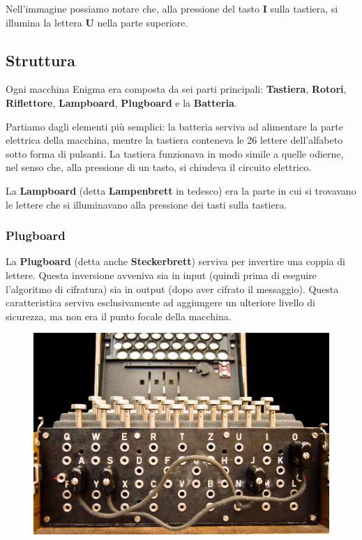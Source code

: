 \documentclass{rapport}
\begin{document}
\vspace{+1.5cm}

Nell'immagine possiamo notare che, alla pressione del tasto \textbf{I} sulla tastiera, si illumina la lettera \textbf{U} nella parte superiore.

\afterpage{\clearpage}



\newpage
\subsection{Struttura}

Ogni macchina Enigma era composta da sei parti principali: \textbf{Tastiera}, \textbf{Rotori}, \textbf{Riflettore}, \textbf{Lampboard}, \textbf{Plugboard} e la \textbf{Batteria}.  

Partiamo dagli elementi più semplici: la batteria serviva ad alimentare la parte elettrica della macchina, mentre la tastiera conteneva le 26 lettere dell'alfabeto sotto forma di pulsanti. La tastiera funzionava in modo simile a quelle odierne, nel senso che, alla pressione di un tasto, si chiudeva il circuito elettrico.  

La \textbf{Lampboard} (detta \textbf{Lampenbrett} in tedesco) era la parte in cui si trovavano le lettere che si illuminavano alla pressione dei tasti sulla tastiera.  

\subsubsection{Plugboard}

La \textbf{Plugboard} (detta anche \textbf{Steckerbrett}) serviva per invertire una coppia di lettere. Questa inversione avveniva sia in input (quindi prima di eseguire l'algoritmo di cifratura) sia in output (dopo aver cifrato il messaggio). Questa caratteristica serviva esclusivamente ad aggiungere un ulteriore livello di sicurezza, ma non era il punto focale della macchina.

\begin{figure}[h]
    \centering
    \includegraphics[width=0.6\linewidth]{logos/2_3cripto.jpg}
\end{figure}
\end{document}
